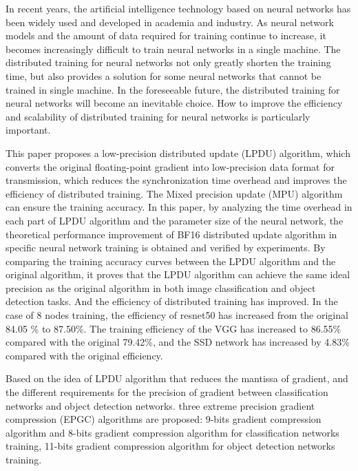 \begin{eabstract}
In recent years, the artificial intelligence technology based on neural networks has been widely used and developed in academia and industry. As neural network models and the amount of data required for training continue to increase, it becomes increasingly difficult to train neural networks in a single machine. The distributed training for neural networks not only greatly shorten the training time, but also provides a solution for some neural networks that cannot be trained in single machine. In the foreseeable future, the distributed training for neural networks will become an inevitable choice. How to improve the efficiency and scalability of distributed training for neural networks is particularly important.

This paper proposes a low-precision distributed update (LPDU) algorithm, which converts the original floating-point gradient into low-precision data format for transmission, which reduces the synchronization time overhead and improves the efficiency of distributed training. The Mixed precision update  (MPU) algorithm can ensure the training accuracy. In this paper, by analyzing the time overhead in each part of LPDU algorithm and the parameter size of the neural network, the theoretical performance improvement of BF16 distributed update algorithm in specific neural network training is obtained and verified by experiments. By comparing the training accuracy curves between the LPDU algorithm and the original algorithm, it proves that the LPDU algorithm can achieve the same ideal precision as the original algorithm in both image classification and object detection tasks. And the efficiency of distributed training has improved. In the case of 8 nodes training, the efficiency of resnet50 has increased from the original 84.05 \% to 87.50\%. The training efficiency of the VGG has increased to 86.55\% compared with the original 79.42\%, and the SSD network has increased by 4.83\% compared with the original efficiency.

Based on the idea of LPDU algorithm that reduces the mantissa of gradient, and the different requirements for the precision of gradient between classification networks and object detection networks. three extreme precision gradient compression (EPGC) algorithms are proposed: 9-bits gradient compression algorithm and 8-bits gradient compression algorithm for classification networks training, 11-bits gradient compression algorithm for object detection networks training.


\end{eabstract}
